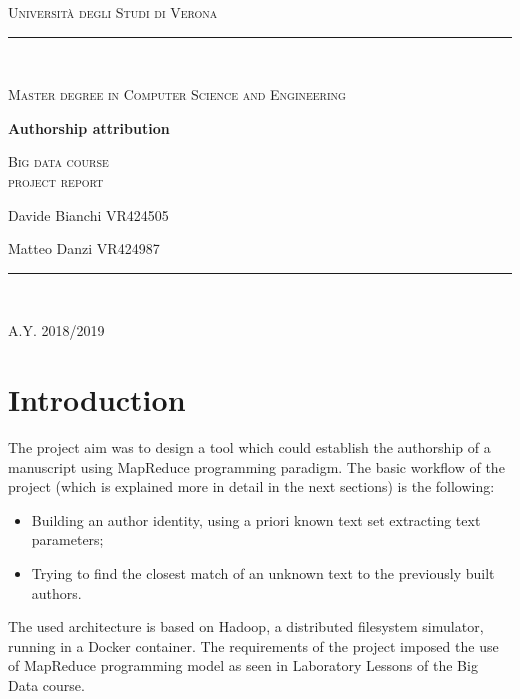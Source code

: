 \documentclass[a4paper,11pt, twoside]{article}
\begin{document}
	\clearpage
	\begin{titlepage}
		\centering
		{\scshape\LARGE Università degli Studi di Verona \par}
		\noindent\rule{\textwidth}{0.5pt}\\
		{\scshape\large Master degree in Computer Science and Engineering\par}
		\vspace{6cm}
		{\huge\bfseries Authorship attribution\par}
		\vspace{1cm}
		{\Large\scshape Big data course\\ \large project report\par}
		\vspace{2cm}
		{\large Davide Bianchi VR424505\par
		\large Matteo Danzi VR424987\par}
		\vspace{1cm}
		\vspace{5cm}
		\vspace*{\fill}
		\noindent\rule{\textwidth}{0.5pt}\\
		{\large A.Y. 2018/2019\par}
	\end{titlepage}
	\thispagestyle{empty}
	\newpage
	\tableofcontents
	\newpage
	
	\section{Introduction}
	The project aim was to design a tool which could establish the authorship of a manuscript using MapReduce programming paradigm. The basic workflow of the project (which is explained more in detail in the next sections) is the following:\begin{itemize}
		\item Building an author identity, using a priori known text set extracting text parameters;
		\item Trying to find the closest match of an unknown text to the previously built authors.
	\end{itemize}

	\noindent
	The used architecture is based on Hadoop, a distributed filesystem simulator, running in a Docker container. The requirements of the project imposed the use of MapReduce programming model as seen in Laboratory Lessons of the Big Data course.
	
\end{document}
